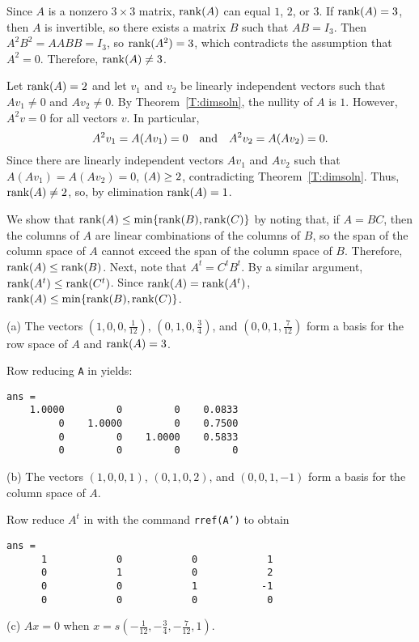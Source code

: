 \documentclass{ximera}
\begin{document}
Since $A$ is a nonzero $3 \times 3$ matrix, ${\rm rank}(A)$ can equal $1$,
$2$, or $3$.  If ${\rm rank}(A) = 3$, then $A$ is invertible, so there
exists a matrix $B$ such that $AB = I_3$.  Then $A^2B^2 = AABB = I_3$,
so ${\rm rank}(A^2) = 3$, which contradicts the assumption that $A^2 = 0$.
Therefore, ${\rm rank}(A) \neq 3$.

\para Let ${\rm rank}(A) = 2$ and let $v_1$ and $v_2$ be linearly independent
vectors such that $Av_1 \neq 0$ and $Av_2 \neq 0$.  By
Theorem~\ref{T:dimsoln}, the nullity of $A$ is $1$.  However,
$A^2v = 0$ for all vectors $v$.  In particular,
\[
A^2v_1 = A(Av_1) = 0 \quad\mbox{and}\quad A^2v_2 = A(Av_2) = 0.
\]
Since there are linearly independent vectors $Av_1$ and $Av_2$ such
that $A(Av_1) = A(Av_2) = 0$, $\null(A) \geq 2$, contradicting
Theorem~\ref{T:dimsoln}.  Thus, ${\rm rank}(A) \neq 2$, so, by elimination
${\rm rank}(A) = 1$.

We show that ${\rm rank}(A) \leq \min\{{\rm rank}(B),{\rm rank}(C)\}$ by noting that,
if $A = BC$, then the columns of $A$ are linear combinations of the
columns of $B$, so the span of the column space of $A$ cannot exceed
the span of the column space of $B$.  Therefore, ${\rm rank}(A) \leq
{\rm rank}(B)$.  Next, note that $A^t = C^tB^t$.  By a similar argument,
${\rm rank}(A^t) \leq {\rm rank}(C^t)$.  Since ${\rm rank}(A) = {\rm rank}(A^t)$,
${\rm rank}(A) \leq \min\{{\rm rank}(B),{\rm rank}(C)\}$.

(a) \ans The vectors $(1,0,0,\frac{1}{12})$, $(0,1,0,\frac{3}{4})$,
and $(0,0,1,\frac{7}{12})$ form a basis for the row space of $A$ and
${\rm rank}(A) = 3$.

\soln Row reducing {\tt A} in \Matlab yields:
\begin{verbatim}
ans =
    1.0000         0         0    0.0833
         0    1.0000         0    0.7500
         0         0    1.0000    0.5833
         0         0         0         0
\end{verbatim}

(b) \ans The vectors $(1,0,0,1)$, $(0,1,0,2)$, and $(0,0,1,-1)$ form a
basis for the column space of $A$.

\soln Row reduce $A^t$ in \Matlab with the command {\tt rref(A')} to obtain
\begin{verbatim}
ans =
      1            0            0            1      
      0            1            0            2      
      0            0            1           -1      
      0            0            0            0      
\end{verbatim}

(c) \ans $Ax = 0$ when $x = s(-\frac{1}{12},-\frac{3}{4}, -\frac{7}{12},1)$.
\end{document}
